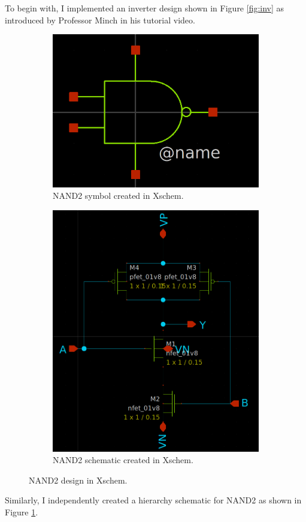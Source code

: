 \documentclass[11pt]{article}
\begin{document}
    To begin with, I implemented an inverter design shown in Figure \ref{fig:inv} as introduced by Professor Minch in his tutorial video.
    \begin{figure}[!ht]
        \begin{subfigure}{0.5\linewidth}
            \includegraphics[width=\linewidth]{NAND2_sym.png}
            \caption{NAND2 symbol created in Xschem.}
        \end{subfigure}
        \begin{subfigure}{0.5\linewidth}
            \includegraphics[width=\linewidth]{NAND2_sch.png}
            \caption{NAND2 schematic created in Xschem.}
        \end{subfigure}
        \caption{NAND2 design in Xschem.}
        \label{fig:nand2}
    \end{figure}
    Similarly, I independently created a hierarchy schematic for NAND2 as shown in Figure \ref{fig:nand2}.
\end{document}
